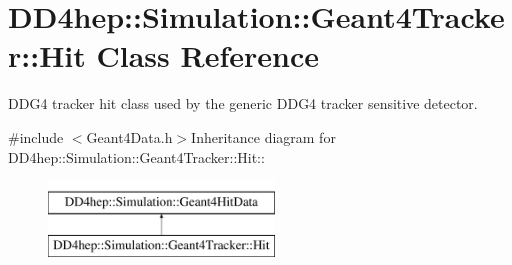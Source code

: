 \hypertarget{class_d_d4hep_1_1_simulation_1_1_geant4_tracker_1_1_hit}{
\section{DD4hep::Simulation::Geant4Tracker::Hit Class Reference}
\label{class_d_d4hep_1_1_simulation_1_1_geant4_tracker_1_1_hit}
}


DDG4 tracker hit class used by the generic DDG4 tracker sensitive detector.  


{\ttfamily \#include $<$Geant4Data.h$>$}Inheritance diagram for DD4hep::Simulation::Geant4Tracker::Hit::\begin{figure}[H]
\begin{center}
\leavevmode
\includegraphics[height=2cm]{class_d_d4hep_1_1_simulation_1_1_geant4_tracker_1_1_hit}
\end{center}
\end{figure}

